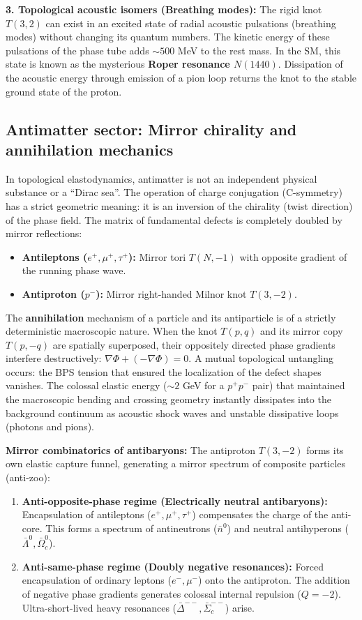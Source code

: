 \documentclass[11pt,a4paper]{article}
\begin{document}
\textbf{3. Topological acoustic isomers (Breathing modes):}
The rigid knot $T(3,2)$ can exist in an excited state of radial acoustic pulsations (breathing modes) without changing its quantum numbers. The kinetic energy of these pulsations of the phase tube adds $\sim 500$ MeV to the rest mass. In the SM, this state is known as the mysterious \textbf{Roper resonance $N(1440)$}. Dissipation of the acoustic energy through emission of a pion loop returns the knot to the stable ground state of the proton.

\subsection{Antimatter sector: Mirror chirality and annihilation mechanics}
In topological elastodynamics, antimatter is not an independent physical substance or a ``Dirac sea''. The operation of charge conjugation (C-symmetry) has a strict geometric meaning: it is an inversion of the chirality (twist direction) of the phase field. The matrix of fundamental defects is completely doubled by mirror reflections:
\begin{itemize}
    \item \textbf{Antileptons ($e^+, \mu^+, \tau^+$):} Mirror tori $T(N, -1)$ with opposite gradient of the running phase wave.
    \item \textbf{Antiproton ($p^-$):} Mirror right-handed Milnor knot $T(3, -2)$.
\end{itemize}

The \textbf{annihilation} mechanism of a particle and its antiparticle is of a strictly deterministic macroscopic nature. When the knot $T(p,q)$ and its mirror copy $T(p,-q)$ are spatially superposed, their oppositely directed phase gradients interfere destructively: $\nabla \Phi + (-\nabla \Phi) = 0$. A mutual topological untangling occurs: the BPS tension that ensured the localization of the defect shapes vanishes. The colossal elastic energy ($\sim 2$ GeV for a $p^+p^-$ pair) that maintained the macroscopic bending and crossing geometry instantly dissipates into the background continuum as acoustic shock waves and unstable dissipative loops (photons and pions). 

\textbf{Mirror combinatorics of antibaryons:}
The antiproton $T(3,-2)$ forms its own elastic capture funnel, generating a mirror spectrum of composite particles (anti-zoo):
\begin{enumerate}
    \item \textbf{Anti-opposite-phase regime (Electrically neutral antibaryons):} Encapsulation of antileptons ($e^+, \mu^+, \tau^+$) compensates the charge of the anti-core. This forms a spectrum of antineutrons ($\bar{n}^0$) and neutral antihyperons ($\bar{\Lambda}^0, \bar{\Omega}_c^0$).
    \item \textbf{Anti-same-phase regime (Doubly negative resonances):} Forced encapsulation of ordinary leptons ($e^-, \mu^-$) onto the antiproton. The addition of negative phase gradients generates colossal internal repulsion ($Q=-2$). Ultra-short-lived heavy resonances ($\bar{\Delta}^{--}, \bar{\Sigma}_c^{--}$) arise.
\end{enumerate}
\end{document}
